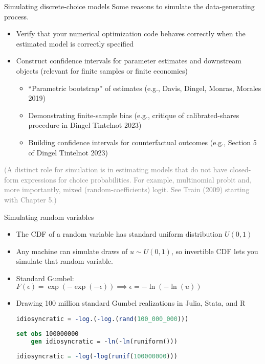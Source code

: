 \documentclass[11pt,notes=hide,aspectratio=169]{beamer}
\begin{document}
\begin{frame}{Simulating discrete-choice models}
Some reasons to simulate the data-generating process.
\begin{itemize}
\item Verify that your numerical optimization code behaves correctly when the estimated model is correctly specified
\item Construct confidence intervals for parameter estimates and downstream objects (relevant for finite samples or finite economies)
\begin{itemize}
\item ``Parametric bootstrap'' of estimates (e.g., Davis, Dingel, Monras, Morales 2019)
\item Demonstrating finite-sample bias (e.g., critique of calibrated-shares procedure in Dingel Tintelnot 2023)
\item Building confidence intervals for counterfactual outcomes (e.g., Section 5 of Dingel Tintelnot 2023)
\end{itemize}
\end{itemize}
\textcolor{gray}{(A distinct role for simulation is in estimating models that do not have closed-form expressions for choice probabilities. For example, multinomial probit and, more importantly, mixed (random-coefficients) logit. See Train (2009) starting with Chapter 5.)}
\end{frame}
\begin{frame}[fragile]{Simulating random variables}
\begin{itemize}
\item The CDF of a random variable has standard uniform distribution $U(0,1)$
\item Any machine can simulate draws of $u \sim U(0,1)$,
so invertible CDF lets you simulate that random variable.
\item Standard Gumbel: $F(\epsilon) = \exp(-\exp(-\epsilon)) \implies \epsilon = -\ln(-\ln(u))$
\item Drawing 100 million standard Gumbel realizations in Julia, Stata, and R
\begin{lstlisting}[language=julia]
	idiosyncratic = -log.(-log.(rand(100_000_000)))
\end{lstlisting}
\begin{lstlisting}[language=stata]
	set obs 100000000
	gen idiosyncratic = -ln(-ln(runiform()))
\end{lstlisting}
\begin{lstlisting}[language=R]
	idiosyncratic = -log(-log(runif(100000000)))
\end{lstlisting}
\end{itemize}
\end{frame}
\end{document}
